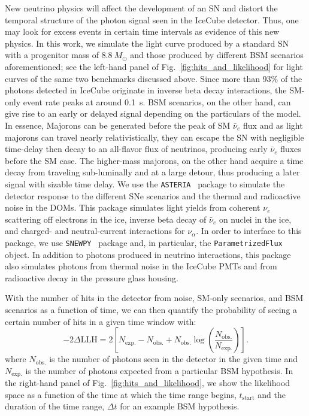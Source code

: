 New neutrino physics will affect the development of an SN and distort the temporal structure of the photon signal seen in the IceCube detector.
Thus, one may look for excess events in certain time intervals as evidence of this new physics.
In this work, we simulate the light curve produced by a standard SN with a progenitor mass of $8.8~M_{\odot}$ and those produced by different BSM scenarios aforementioned; see the left-hand panel of Fig.~\ref{fig:hits_and_likelihood} for light curves of the same two benchmarks discussed above.
Since more than 93\% of the photons detected in IceCube originate in inverse beta decay interactions, the SM-only event rate peaks at around 0.1~s.
BSM scenarios, on the other hand, can give rise to an early or delayed signal depending on the particulars of the model.
In essence, Majorons can be generated before the peak of SM $\bar{\nu}_{e}$ flux and as light majorons can travel nearly relativistically, they can escape the SN with negligible time-delay then decay to an all-flavor flux of neutrinos, producing early $\bar{\nu}_{e}$ fluxes before the SM case.
The higher-mass majorons, on the other hand acquire a time decay from traveling sub-luminally and at a large detour, thus producing a later signal with sizable time delay.
We use the \texttt{ASTERIA}~\cite{spencer_griswold_2020_3926835} package to simulate the detector response to the different SNe scenarios and the thermal and radioactive noise in the DOMs.
 This package simulates light yields from coherent $\nu_{e}$ scattering off electrons in the ice, inverse beta decay of $\bar{\nu}_{e}$ on nuclei in the ice, and charged- and neutral-current interactions for $\nu_{\alpha}$.
In order to interface to this package, we use \texttt{SNEWPY}~\cite{SNEWS:2021ewj} package and, in particular, the \texttt{ParametrizedFlux} object.
In addition to photons produced in neutrino interactions, this package also simulates photons from thermal noise in the IceCube PMTs and from radioactive decay in the pressure glass housing.

With the number of hits in the detector from noise, SM-only scenarios, and BSM scenarios as a function of time, we can then quantify the probability of seeing a certain number of hits in a given time window with:
\begin{equation}
    -2\Delta\mathrm{LLH} = 2 \left[N_{\mathrm{exp.}} - N_{\mathrm{obs.}} + N_{\mathrm{obs.}}\log\left(\frac{N_{\mathrm{obs.}}}{N_{\mathrm{exp.}}}\right)\right].
\end{equation}
where $N_{\mathrm{obs.}}$ is the number of photons seen in the detector in the given time and $N_{\mathrm{exp.}}$ is the number of photons expected from a particular BSM hypothesis.
In the right-hand panel of Fig.~\ref{fig:hits_and_likelihood}, we show the likelihood space as a function of the time at which the time range begins, $t_{\mathrm{start}}$ and the duration of the time range, $\Delta t$ for an example BSM hypothesis.

